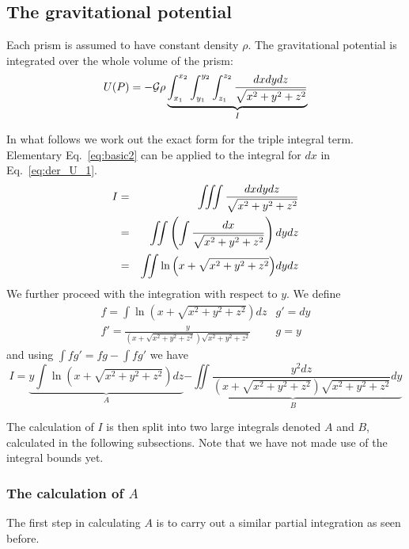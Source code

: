 \subsection{The gravitational potential}

Each prism is assumed to have constant density $\rho$. The gravitational potential is integrated over the whole volume of the prism:
\begin{equation}
U(P) =  -{\cal G}  \rho \underbrace{\int_{x_1}^{x_2} \int_{y_1}^{y_2} \int_{z_1}^{z_2} \frac{dx dy dz}{\sqrt{x^2+y^2+z^2}}}_{I} \label{eq:der_U_1}
\end{equation}

In what follows we work out the exact form for the triple integral term. Elementary Eq.~\eqref{eq:basic2} can be applied to the integral for $dx$ 
in Eq.~\eqref{eq:der_U_1}.
\begin{eqnarray}
I
&=& \iiint \frac{dx dy dz}{\sqrt{x^2+y^2+z^2}}  \nonumber\\
&=& \iint \left(\int \frac{dx}{\sqrt{x^2+y^2+z^2}} \right) dydz \nonumber\\
&=& \iint \ln{\left( x+\sqrt{x^2+y^2+z^2} \right)} dy dz
\end{eqnarray}
We further proceed with the integration with respect to $y$. We define
\[
\begin{array}{c|c}
  f = \int \ln{\left( x+\sqrt{x^2+y^2+z^2} \right)} dz 
  & g' = dy \\ 
  \hline
  f' = \frac{y}{\left( x+\sqrt{x^2+y^2+z^2} \right) \sqrt{x^2+y^2+z^2}} 
  & g=y
 \end{array}
\]
and using $\int f g'  = f g - \int f g'$ we have 
\begin{equation}
I= 
\underbrace{y \int \ln{ \left( x + \sqrt{x^2+y^2+z^2} \right) } dz}_{A} 
\underbrace{- \iint  \frac{y^2 dz}{\left( x+\sqrt{x^2+y^2+z^2}\right) \sqrt{x^2+y^2+z^2}} dy}_{B} 
\end{equation}

The calculation of $I$ is then split into two large integrals denoted
$A$ and $B$, calculated in the following subsections.
Note that we have not made use of the integral bounds yet.  

\subsubsection{The calculation of $A$} \label{subsection:calc_A}

The first step in calculating $A$ is to carry out a similar partial integration as seen before. 

